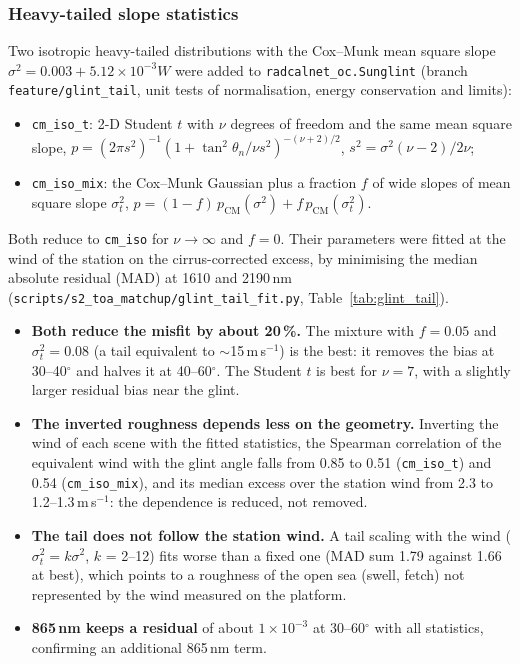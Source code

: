 \documentclass[11pt,a4paper]{article}
\newcommand{\code}[1]{\texttt{#1}}
\begin{document}
\subsubsection{Heavy-tailed slope statistics}
\label{sec:glint_tail}
Two isotropic heavy-tailed distributions with the Cox--Munk mean square slope $\sigma^2 = 0.003 + 5.12\times10^{-3}W$
were added to \code{radcalnet\_oc.Sunglint} (branch \code{feature/glint\_tail}, unit tests of normalisation,
energy conservation and limits):
\begin{itemize}
\item \code{cm\_iso\_t}: 2-D Student $t$ with $\nu$ degrees of freedom and the same mean square slope,
  $p = (2\pi s^2)^{-1}(1+\tan^2\theta_n/\nu s^2)^{-(\nu+2)/2}$, $s^2 = \sigma^2(\nu-2)/2\nu$;
\item \code{cm\_iso\_mix}: the Cox--Munk Gaussian plus a fraction $f$ of wide slopes of mean square slope
  $\sigma_t^2$, $p = (1-f)\,p_\mathrm{CM}(\sigma^2) + f\,p_\mathrm{CM}(\sigma_t^2)$.
\end{itemize}
Both reduce to \code{cm\_iso} for $\nu\to\infty$ and $f=0$. Their parameters were fitted at the wind of the station
on the cirrus-corrected excess, by minimising the median absolute residual (MAD) at 1610 and 2190\,nm
(\code{scripts/s2\_toa\_matchup/glint\_tail\_fit.py}, Table~\ref{tab:glint_tail}).

\begin{itemize}
\item \textbf{Both reduce the misfit by about 20\,\%.} The mixture with $f = 0.05$ and $\sigma_t^2 = 0.08$ (a tail
  equivalent to $\sim$15\,m\,s$^{-1}$) is the best: it removes the bias at 30--40$^\circ$ and halves it at
  40--60$^\circ$. The Student $t$ is best for $\nu = 7$, with a slightly larger residual bias near the glint.
\item \textbf{The inverted roughness depends less on the geometry.} Inverting the wind of each scene with the fitted
  statistics, the Spearman correlation of the equivalent wind with the glint angle falls from 0.85 to 0.51
  (\code{cm\_iso\_t}) and 0.54 (\code{cm\_iso\_mix}), and its median excess over the station wind from 2.3 to
  1.2--1.3\,m\,s$^{-1}$: the dependence is reduced, not removed.
\item \textbf{The tail does not follow the station wind.} A tail scaling with the wind ($\sigma_t^2 = k\sigma^2$,
  $k$ = 2--12) fits worse than a fixed one (MAD sum 1.79 against 1.66 at best), which points to a roughness of the
  open sea (swell, fetch) not represented by the wind measured on the platform.
\item \textbf{865\,nm keeps a residual} of about $1\times10^{-3}$ at 30--60$^\circ$ with all statistics,
  confirming an additional 865\,nm term.
\end{itemize}
\end{document}
